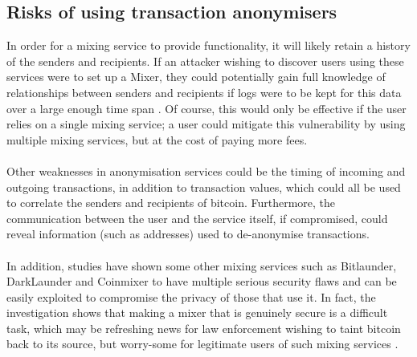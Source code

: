 \subsection{Risks of using transaction anonymisers}
In order for a mixing service to provide functionality, it will likely retain a history of the senders and recipients. If an attacker wishing to discover users using these services were to set up a Mixer, they could potentially gain full knowledge of relationships between senders and recipients if logs were to be kept for this data over a large enough time span \cite{RefWorks:doc:5c3dace5e4b0613d0cda512b}. Of course, this would only be effective if the user relies on a single mixing service; a user could mitigate this vulnerability by using multiple mixing services, but at the cost of paying more fees. 
\\\\
Other weaknesses in anonymisation services could be the timing of incoming and outgoing transactions, in addition to transaction values, which could all be used to correlate the senders and recipients of bitcoin. Furthermore, the communication between the user and the service itself, if compromised, could reveal information (such as addresses) used to de-anonymise transactions. 
\\\\
In addition, studies have shown some other mixing services such as Bitlaunder, DarkLaunder and Coinmixer to have multiple serious security flaws and can be easily exploited to compromise the privacy of those that use it. In fact, the investigation shows that making a mixer that is genuinely secure is a difficult task, which may be refreshing news for law enforcement wishing to taint bitcoin back to its source, but worry-some for legitimate users of such mixing services \cite{RefWorks:doc:5c3db214e4b0854ae6124c26}. 


